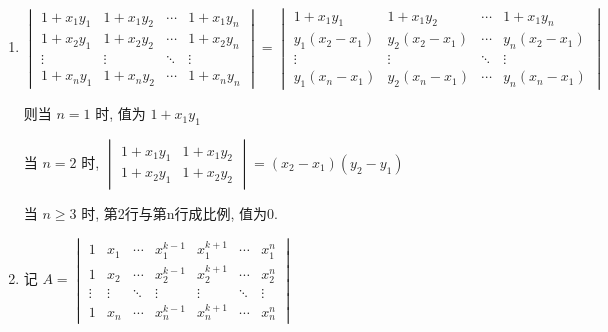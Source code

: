 \subsection{} %


	\paragraph{} %
		\begin{enumerate}
			\item %
			      \[ \begin{vmatrix}
					      1+x_{1}y_{1} & 1+x_{1}y_{2} & \cdots & 1+x_{1}y_{n} \\
					      1+x_{2}y_{1} & 1+x_{2}y_{2} & \cdots & 1+x_{2}y_{n} \\
					      \vdots       & \vdots       & \ddots & \vdots       \\
					      1+x_{n}y_{1} & 1+x_{n}y_{2} & \cdots & 1+x_{n}y_{n}
				      \end{vmatrix} = \begin{vmatrix}
					      1+x_{1}y_{1}       & 1+x_{1}y_{2}       & \cdots & 1+x_{1}y_{n}       \\
					      y_{1}(x_{2}-x_{1}) & y_{2}(x_{2}-x_{1}) & \cdots & y_{n}(x_{2}-x_{1}) \\
					      \vdots             & \vdots             & \ddots & \vdots             \\
					      y_{1}(x_{n}-x_{1}) & y_{2}(x_{n}-x_{1}) & \cdots & y_{n}(x_{n}-x_{1})
				      \end{vmatrix} \]

			      则当 \( n=1 \) 时, 值为 \( 1+x_{1}y_{1} \)

			      当 \( n=2 \) 时, \( \begin{vmatrix}
				      1+x_{1}y_{1} & 1+x_{1}y_{2} \\
				      1+x_{2}y_{1} & 1+x_{2}y_{2}
			      \end{vmatrix} = (x_{2}-x_{1})(y_{2}-y_{1}) \)

			      当 \( n \geq 3 \) 时, 第2行与第n行成比例, 值为0.
			\item %
			      记 \( A = \begin{vmatrix}
				      1      & x_{1}  & \cdots & x_{1}^{k-1} & x_{1}^{k+1} & \cdots & x_{1}^{n} \\
				      1      & x_{2}  & \cdots & x_{2}^{k-1} & x_{2}^{k+1} & \cdots & x_{2}^{n} \\
				      \vdots & \vdots & \ddots & \vdots      & \vdots      & \ddots & \vdots    \\
				      1      & x_{n}  & \cdots & x_{n}^{k-1} & x_{n}^{k+1} & \cdots & x_{n}^{n}
			      \end{vmatrix} \)


\end{enumerate}
